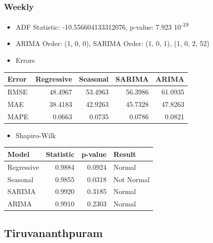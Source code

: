 \documentclass[a4paper,12pt]{article}
\begin{document}
\subsubsection{Weekly}
\label{sec:orgcbe169a}
\begin{itemize}
\item ADF Statistic: -10.556604133312076, p-value: 7.923 \texttimes{} 10\textsuperscript{-19}
\item ARIMA Order: (1, 0, 0), SARIMA Order: (1, 0, 1), (1, 0, 2, 52)
\item Errors
\end{itemize}
\begin{center}
\begin{tabular}{lrrrr}
Error & \textbf{Regressive} & Seasonal & SARIMA & ARIMA\\[0pt]
\hline
RMSE & 48.4967 & 53.4963 & 56.3986 & 61.0935\\[0pt]
MAE & 38.4183 & 42.9263 & 45.7328 & 47.8263\\[0pt]
MAPE & 0.0663 & 0.0735 & 0.0786 & 0.0821\\[0pt]
\end{tabular}
\end{center}
\begin{itemize}
\item Shapiro-Wilk
\end{itemize}
\begin{center}
\begin{tabular}{lrrl}
Model & Statistic & p-value & Result\\[0pt]
\hline
Regressive & 0.9884 & 0.0924 & Normal\\[0pt]
Seasonal & 0.9855 & 0.0318 & Not Normal\\[0pt]
SARIMA & 0.9920 & 0.3185 & Normal\\[0pt]
ARIMA & 0.9910 & 0.2303 & Normal\\[0pt]
\end{tabular}
\end{center}

\subsection{Tiruvananthpuram}
\label{sec:orga4edf91}
\end{document}
